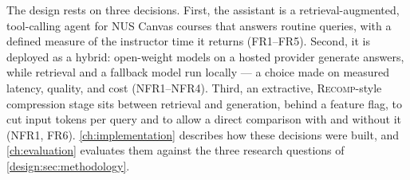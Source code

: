 The design rests on three decisions. First, the assistant is a
retrieval-augmented, tool-calling agent for NUS Canvas courses that
answers routine queries, with a defined measure of the instructor time it
returns (FR1--FR5). Second, it is deployed as
a hybrid: open-weight models on a hosted provider generate answers, while
retrieval and a fallback model run locally --- a choice made on measured
latency, quality, and cost (NFR1--NFR4). Third, an extractive,
\textsc{Recomp}-style compression stage sits between retrieval and generation,
behind a feature flag, to cut input tokens per query and to allow a direct
comparison with and without it (NFR1, FR6). \autoref{ch:implementation}
describes how these decisions were built, and \autoref{ch:evaluation}
evaluates them against the three research questions of
\autoref{design:sec:methodology}.
